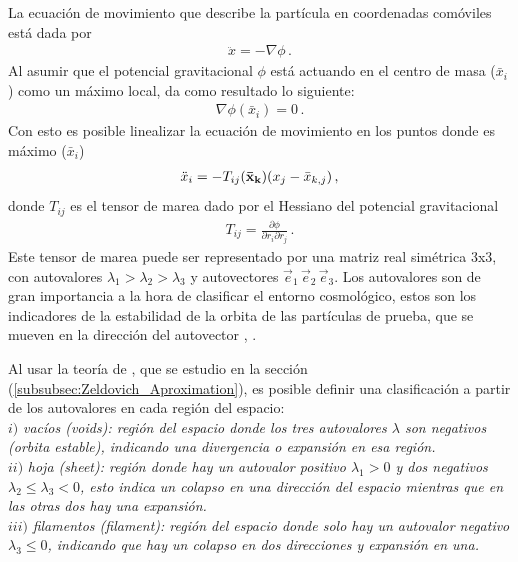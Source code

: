 La ecuación de movimiento que describe la partícula en coordenadas comóviles está dada por 
\begin{align}
    \ddot{x}=-\nabla\phi\,.
\end{align}
%
Al asumir que el potencial gravitacional $\phi$ está actuando en el centro de masa ($\bar{x}_{i}$) como un máximo local, da como resultado lo siguiente:
%
\begin{align}
    \nabla\phi(\bar{x}_{i})=0\,.
\end{align}
%
Con esto es posible linealizar la ecuación de movimiento en los puntos donde es máximo ($\bar{x}_{i}$)
%
\begin{align}
    \ddot{x}_{i}=-T_{ij}({\bf{\bar{x}}_{k}})(x_{j}-\bar{x}_{k,j})\,,
\end{align}
%
donde $T_{ij}$ es el tensor de marea dado por el Hessiano del potencial gravitacional
%
\begin{align}
    T_{ij}=\frac{\partial \phi}{\partial r_{i} \partial r_{j}}\,.
\end{align}
%
Este tensor de marea puede ser representado por una matriz real simétrica 3x3, con autovalores $\lambda_{1}>\lambda_{2}>\lambda_{3}$ y  autovectores $\vec{e}_{1}\, \vec{e}_{2}\, \vec{e}_{3}$. Los autovalores son de gran importancia a la hora de clasificar el entorno cosmológico, estos son los indicadores de la estabilidad de la orbita de las partículas de prueba, que se mueven en la dirección del autovector \cite{padmanabhan1995}, \cite{hahn2007}.

Al usar la teoría de \cite{zeldovich1970}, que se estudio en la sección (\ref{subsubsec:Zeldovich_Aproximation}), es posible definir una clasificación a partir de los autovalores en cada región del espacio:\\

$i)$ {\it{vacíos (voids)}: región del espacio donde los tres autovalores $\lambda$ son negativos (orbita estable), indicando una divergencia o expansión en esa región.}\\

$ii)$ {\it{hoja (sheet)}: región donde hay un autovalor positivo $\lambda_{1}>0$ y dos negativos $\lambda_{2} \leq \lambda_{3}< 0$, esto indica un colapso en una dirección del espacio mientras que en las otras dos hay una expansión.}\\

$iii)$ {\it{filamentos (filament)}: región del espacio donde solo hay un autovalor negativo $\lambda_{3}\leq 0$, indicando que hay un colapso en dos direcciones y expansión en una.} \\

